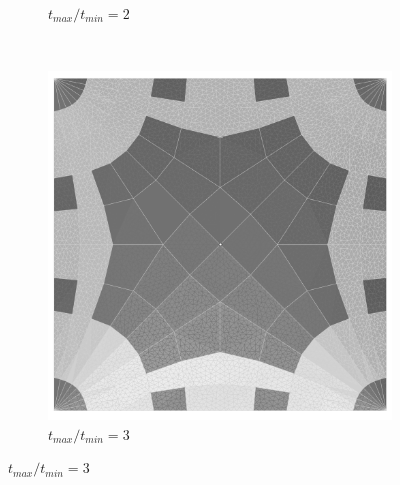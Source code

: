 \begin{figure}[H]
\begin{subfigure}[b]{.32\textwidth}
  \caption{$t_{max}/t_{min}=2$}
\end{subfigure}
~
\begin{subfigure}[b]{.32\textwidth}
  \centering
  \includegraphics[width=.99\linewidth]{images/t_opt_l2d15_gamma3}
  \caption{$t_{max}/t_{min}=3$}
\end{subfigure}


\end{figure}
